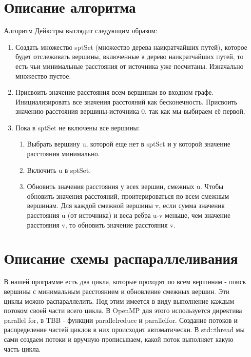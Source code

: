 \documentclass{report}
\begin{document}
\section*{Описание алгоритма}
\par Алгоритм Дейкстры выглядит следующим образом:
\begin{enumerate}
\item Создать множество sptSet (множество дерева наикратчайших путей), которое будет отслеживать вершины, включенные в дерево наикратчайших путей, то есть чьи минимальные расстояния от источника уже посчитаны. Изначально множество пустое.
\item Присвоить значение расстояния всем вершинам во входном графе. Инициализировать все значения расстояний как бесконечность. Присвоить значению расстояния вершины-источника 0, так как мы выбираем её первой.
\item Пока в sptSet не включены все вершины:
  \begin{enumerate}
    \item Выбрать вершину u, которой еще нет в sptSet и у которой значение расстояния минимально.
    \item Включить u в sptSet.
    \item Обновить значения расстояния у всех вершин, смежных u. Чтобы обновить значения расстояний, проитерироваться по всем смежным вершинам. Для каждой смежной вершины v, если сумма значения расстояния u (от источника) и веса ребра u-v меньше, чем значение расстояния v, то обновить значение расстояния v.
  \end{enumerate}
\end{enumerate}
\newpage

\section*{Описание схемы распараллеливания}
\par В нашей программе есть два цикла, которые проходят по всем вершинам - поиск вершины с минимальным расстоянием и обновление смежных вершин. Эти циклы можно распараллелить. Под этим имеется в виду выполнение каждым потоком своей части всего цикла. В OpenMP для этого используется директива parallel for, в TBB - функции parallel\textunderscore reduce и parallel\textunderscore for. Создание потоков и распределение частей циклов в них происходит автоматически. В std::thread мы сами создаем потоки и вручную прописываем, какой поток выполняет какую часть цикла.
\end{document}
